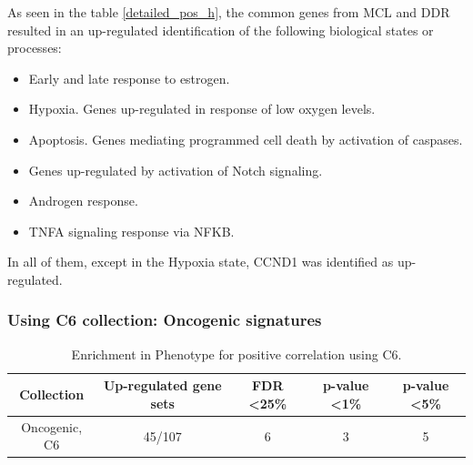 As seen in the table \ref{detailed_pos_h}, the common genes from MCL and DDR resulted in an up-regulated identification of the following biological states or processes:

\begin{itemize}
    \item Early and late response to estrogen.
    \item Hypoxia. Genes up-regulated in response of low oxygen levels.
    \item Apoptosis. Genes mediating programmed cell death by activation of caspases.
    \item Genes up-regulated by activation of Notch signaling.
    \item Androgen response.
    \item TNFA signaling response via NFKB.
\end{itemize}

In all of them, except in the Hypoxia state, CCND1 was identified as up-regulated.

\subsubsection{Using C6 collection: Oncogenic signatures}

\begin{table}[h!]
    \centering
    \begin{tabular}{ccccc}
    \hline
    Collection      & Up-regulated gene sets & FDR \textless 25\% & p-value \textless 1\% & p-value \textless 5\% \\ \hline
    Oncogenic, C6   & 45/107                 & 6                                 & 3                                    & 5                                    \\ \hline
    \end{tabular}
    \caption{Enrichment in Phenotype for positive correlation using C6.}
    \label{enr_ph_positive_c6}
    \end{table}

